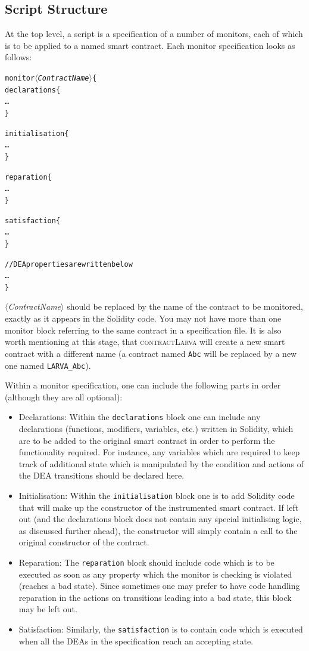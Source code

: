 \documentclass{article}
\newcommand{\contractlarva}{\textsc{contractLarva}\xspace}
\newcommand{\keyword}[1]{\textit{$\langle$#1$\rangle$}}
\begin{document}
  \subsection{Script Structure}

  At the top level, a script is a specification of a number of monitors, each of which is to be applied to a named smart contract. Each monitor specification looks as follows:

  \small\begin{alltt}
  monitor \keyword{ContractName} \{
    declarations \{
      \ldots
    \}
    
    initialisation \{
      \ldots
    \}

    reparation \{
      \ldots
    \}

    satisfaction \{
      \ldots
    \}

    // DEA properties are written below
    \ldots
  \}
  \end{alltt}\normalsize
 
  \keyword{ContractName} should be replaced by the name of the contract to be monitored, exactly as it appears in the Solidity code. You may not have more than one monitor block referring to the same contract in a specification file. It is also worth mentioning at this stage, that \contractlarva will create a new smart contract with a different name (a contract named \texttt{Abc} will be replaced by a new one named \texttt{LARVA\_Abc}).
  
  Within a monitor specification, one can include the following parts in order (although they are all optional):
  
  \begin{itemize}
    \item Declarations: Within the \texttt{declarations} block one can include any declarations (functions, modifiers, variables, etc.)  written in Solidity, which are to be added to the original smart contract in order to perform the functionality required. For instance, any variables which are required to keep track of additional state which is manipulated by the condition and actions of the DEA transitions should be declared here.
    \item Initialisation: Within the \texttt{initialisation} block one is to add Solidity code that will make up the constructor of the instrumented smart contract. If left out (and the declarations block does not contain any special initialising logic, as discussed further ahead), the constructor will simply contain a call to the original constructor of the contract.
    \item Reparation: The \texttt{reparation} block should include code which is to be executed as soon as any property which the monitor is checking is violated (reaches a bad state). Since sometimes one may prefer to have code handling reparation in the actions on transitions leading into a bad state, this block may be left out.
    \item Satisfaction: Similarly, the \texttt{satisfaction} is to contain code which is executed when all the DEAs in the specification reach an accepting state.
  \end{itemize}
\end{document}
